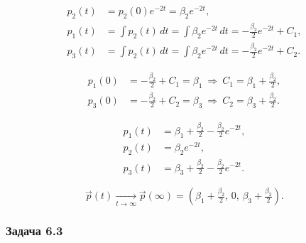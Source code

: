 \[
	\begin{aligned}
		p_2(t) & = p_2(0)e^{-2t} = \beta_2 e^{-2t},                                             \\
		p_1(t) & = \int p_2(t)\,dt = \int \beta_2 e^{-2t}\,dt = -\tfrac{\beta_2}{2}e^{-2t}+C_1, \\
		p_3(t) & = \int p_2(t)\,dt = \int \beta_2 e^{-2t}\,dt = -\tfrac{\beta_2}{2}e^{-2t}+C_2.
	\end{aligned}
\]

\[
	\begin{aligned}
		p_1(0) & = -\tfrac{\beta_2}{2}+C_1=\beta_1 \ \Rightarrow\ C_1=\beta_1+\tfrac{\beta_2}{2}, \\
		p_3(0) & = -\tfrac{\beta_2}{2}+C_2=\beta_3 \ \Rightarrow\ C_2=\beta_3+\tfrac{\beta_2}{2}.
	\end{aligned}
\]

\[
	\begin{aligned}
		p_1(t) & = \beta_1+\tfrac{\beta_2}{2}-\tfrac{\beta_2}{2}e^{-2t}, \\
		p_2(t) & = \beta_2 e^{-2t},                                      \\
		p_3(t) & = \beta_3+\tfrac{\beta_2}{2}-\tfrac{\beta_2}{2}e^{-2t}.
	\end{aligned}
\]

\[
	\vec{p}(t)\xrightarrow[t\to\infty]{}\vec{p}(\infty)=\left(\beta_1+\tfrac{\beta_2}{2},\,0,\,\beta_3+\tfrac{\beta_2}{2}\right).
\]

\subsubsection*{Задача 6.3}

